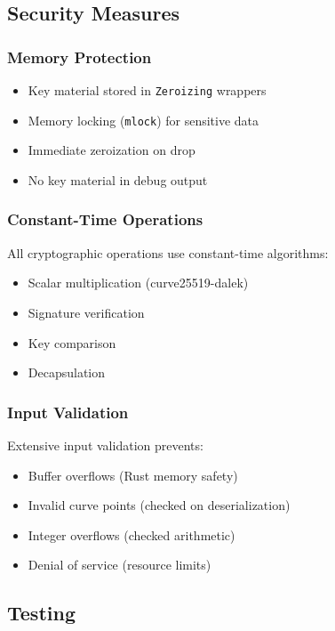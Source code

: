 \subsection{Security Measures}

\subsubsection{Memory Protection}

\begin{itemize}
  \item Key material stored in \texttt{Zeroizing} wrappers
  \item Memory locking (\texttt{mlock}) for sensitive data
  \item Immediate zeroization on drop
  \item No key material in debug output
\end{itemize}

\subsubsection{Constant-Time Operations}

All cryptographic operations use constant-time algorithms:

\begin{itemize}
  \item Scalar multiplication (curve25519-dalek)
  \item Signature verification
  \item Key comparison
  \item Decapsulation
\end{itemize}

\subsubsection{Input Validation}

Extensive input validation prevents:

\begin{itemize}
  \item Buffer overflows (Rust memory safety)
  \item Invalid curve points (checked on deserialization)
  \item Integer overflows (checked arithmetic)
  \item Denial of service (resource limits)
\end{itemize}

\subsection{Testing}

